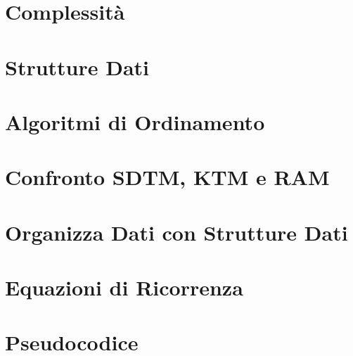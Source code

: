 



\begin{titlepage}
    \maketitle
    \thispagestyle{empty}  %
\end{titlepage}

\section{Complessità}

\newpage

\section{Strutture Dati}

\newpage

\section{Algoritmi di Ordinamento}

\newpage

\section{Confronto SDTM, KTM e RAM}

\newpage

\section{Organizza Dati con Strutture Dati}

\newpage

\section{Equazioni di Ricorrenza}


\newpage

\section{Pseudocodice}



